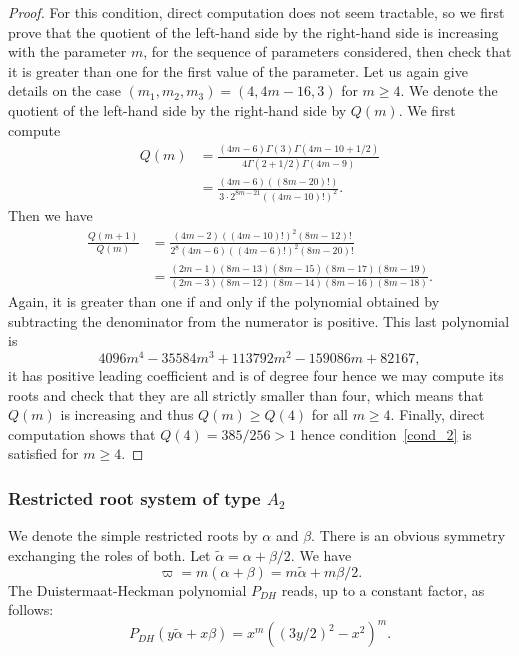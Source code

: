 \documentclass[JEP,XML,SOM,Unicode, NoEqCountersInSection, NoFloatCountersInSection]{cedram}
\theoremstyle{plain}
\theoremstyle{definition}
\begin{document}
\begin{proof}
For this condition, direct computation does not seem tractable, so we first prove
that the quotient of the left-hand side by the right-hand side is increasing with the parameter $m$,
for the sequence of parameters considered,
then check that it is greater than one for the first value of the parameter.
Let us again give details on the case $(m_1,m_2,m_3)=(4,4m-16,3)$ for $m\geq 4$.
We denote the quotient of the left-hand side by the right-hand side by $Q(m)$.
We first compute
\begin{align*}
Q(m)&= \frac{(4m-6)\Gamma(3)\Gamma(4m-10+1/2)}{4\Gamma(2+1/2)\Gamma(4m-9)} \\
& = \frac{(4m-6)((8m-20)!)}{3\cdot 2^{8m-21}((4m-10)!)^2}.
\end{align*}
Then we have
\begin{align*}
\frac{Q(m+1)}{Q(m)}&=\frac{(4m-2)((4m-10)!)^2(8m-12)!}{2^8(4m-6)((4m-6)!)^2(8m-20)!} \\
&= \frac{(2m-1)(8m-13)(8m-15)(8m-17)(8m-19)}{(2m-3)(8m-12)(8m-14)(8m-16)(8m-18)}.
\end{align*}
Again, it is greater than one if and only if the polynomial obtained by subtracting the
denominator from the numerator is positive. This last polynomial is
\begin{equation*}
4096 m^4 - 35584 m^3 + 113792 m^2 - 159086 m + 82167,
\end{equation*}
it has positive leading coefficient and is of degree four
hence we may compute its roots and check
that they are all strictly smaller than four, which means that $Q(m)$ is
increasing and thus $Q(m)\geq Q(4)$ for all $m\geq 4$. Finally, direct computation
shows that $Q(4)=385/256>1$ hence condition~\eqref{cond_2}
is satisfied for $m\geq 4$.
\end{proof}

\subsubsection{Restricted root system of type $A_2$}

We denote the simple restricted roots by $\alpha$ and $\beta$.
There is an obvious symmetry exchanging the roles of both.
Let $\tilde{\alpha}= \alpha+\beta/2$.
We have
\begin{equation*}
\varpi = m(\alpha+\beta)= m\tilde{\alpha}+m\beta/2.
\end{equation*}
The Duistermaat-Heckman polynomial $P_{DH}$ reads,
up to a constant factor, as follows:
\begin{equation*}
P_{DH}(y\tilde{\alpha}+x\beta)=
x^m((3y/2)^2-x^2)^m.
\end{equation*}
\end{document}
